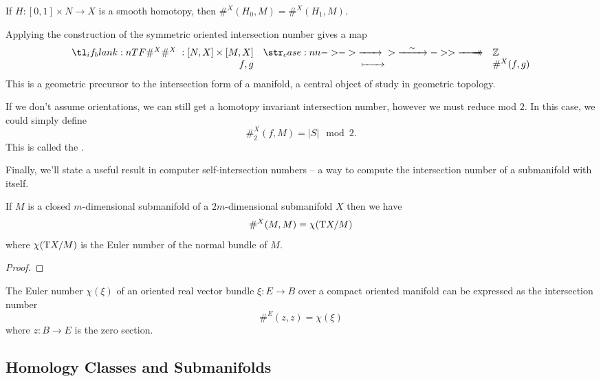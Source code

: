 \begin{corollary}
	If $H : [0,1]\times N \to X$ is a smooth homotopy, then $\#^X(H_0, M) = \#^X(H_1, M)$.
\end{corollary}

Applying the construction of the symmetric oriented intersection number gives a map
\begin{equation}\label{eq:oriented-intersection-number-homotopy}
	\lkxfunc{\#^X}{[N,X]\times [M,X]}{\Z}{f,g}{\#^X(f,g)}
\end{equation}
This is a geometric precursor to the intersection form of a manifold, a central object of study in geometric topology.

\begin{remark}
	If we don't assume orientations, we can still get a homotopy invariant intersection number, however we must reduce mod $2$. In this case, we could simply define 
	\[
		\#_2^X(f,M) = |S|\mod 2.
	\]
	This is called the .
\end{remark}

Finally, we'll state a useful result in computer self-intersection numbers -- a way to compute the intersection number of a submanifold with itself.

\begin{theorem}\label{thm:euler-number-self-intersection}
	If $M$ is a closed $m$-dimensional submanifold of a $2m$-dimensional submanifold $X$ then we have
	\[
		\#^X(M, M) = \chi(\mathrm{T} X/M)
	\]
	where $\chi(\mathrm{T} X/M)$ is the Euler number of the normal bundle of $M$.
\end{theorem}
\begin{proof}
\end{proof}

\begin{corollary}\label{thm:euler-number-self-intersection-corollary}
	The Euler number $\chi(\xi)$ of an oriented real vector bundle $\xi : E \to B$ over a compact oriented manifold can be expressed as the intersection number
	\[
		\#^E(z,z) = \chi(\xi)
	\]
	where $z : B \to E$ is the zero section.
\end{corollary}


\subsection{Homology Classes and Submanifolds}

